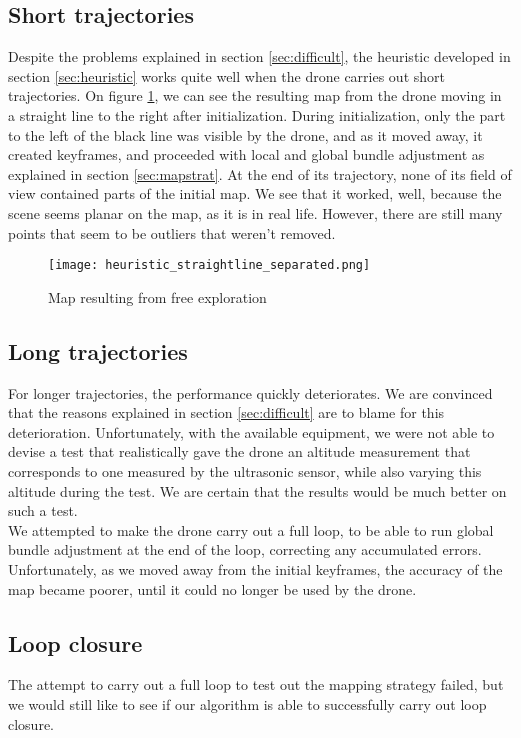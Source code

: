 \subsection{Short trajectories}
Despite the problems explained in section \ref{sec:difficult}, the heuristic developed in section \ref{sec:heuristic} works quite well when the drone carries out short trajectories. On figure \ref{fig:heuristic}, we can see the resulting map from the drone moving in a straight line to the right after initialization. During initialization, only the part to the left of the black line was visible by the drone, and as it moved away, it created keyframes, and proceeded with local and global bundle adjustment as explained in section \ref{sec:mapstrat}. At the end of its trajectory, none of its field of view contained parts of the initial map. We see that it worked, well, because the scene seems planar on the map, as it is in real life. However, there are still many points that seem to be outliers that weren't removed.\\

\begin{figure}[H]
  \centering
  \texttt{[image: heuristic\_straightline\_separated.png]}
\caption{Map resulting from free exploration}
\label{fig:heuristic}
\end{figure}

\subsection{Long trajectories}
For longer trajectories, the performance quickly deteriorates. We are convinced that the reasons explained in section \ref{sec:difficult} are to blame for this deterioration. Unfortunately, with the available equipment, we were not able to devise a test that realistically gave the drone an altitude measurement that corresponds to one measured by the ultrasonic sensor, while also varying this altitude during the test. We are certain that the results would be much better on such a test.\\

We attempted to make the drone carry out a full loop, to be able to run global bundle adjustment at the end of the loop, correcting any accumulated errors. Unfortunately, as we moved away from the initial keyframes, the accuracy of the map became poorer, until it could no longer be used by the drone.

\subsection{Loop closure}
The attempt to carry out a full loop to test out the mapping strategy failed, but we would still like to see  if our algorithm is able to successfully carry out loop closure.\\


